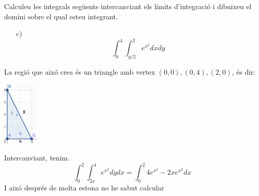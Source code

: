 \documentclass[a4paper, 12pt]{article}
\begin{document}
    \setcounter{numex}{64}
    \begin{exercici}
        Calculeu les integrals següents intercanviant els límits d'integració i dibuixeu el domini
        sobre el qual esteu integrant.
        \begin{itemize}
            \item[c)] $$\int_{0}^{4}\int_{y/2}^{2} e^{x^2}dxdy$$
        \end{itemize}
    \end{exercici}
    \begin{solucio}
        La regió que aixó crea és un triangle amb vertex $\left(0,0\right), \left(0,4\right), \left(2,0\right)$, és dir:
        \begin{center}
            \includegraphics[width=0.125\textwidth]{1.png}\\
        \end{center}
        Intercanviant, tenim.
        $$\int_0^2\int_{2x}^4e^{x^2} dydx = \int_0^2 4e^{x^2}-2xe^{x^2} dx$$
        I aixó després de molta estona no he sabut calcular %
    \end{solucio}
\end{document}
